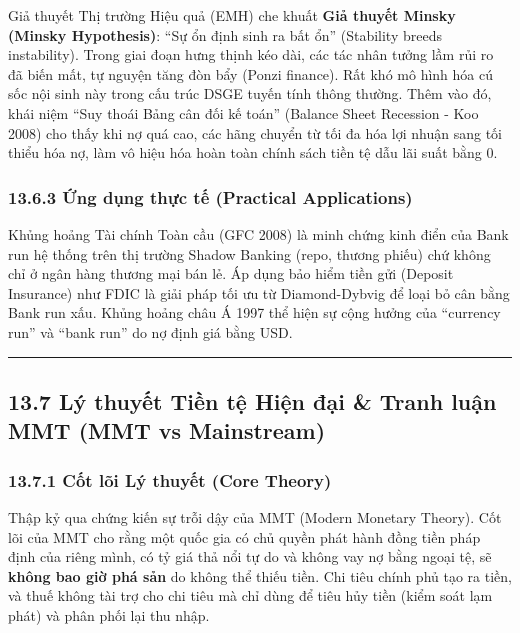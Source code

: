 \documentclass[
]{article}
\begin{document}
Giả thuyết Thị trường Hiệu quả (EMH) che khuất \textbf{Giả thuyết Minsky
(Minsky Hypothesis)}: ``Sự ổn định sinh ra bất ổn'' (Stability breeds
instability). Trong giai đoạn hưng thịnh kéo dài, các tác nhân tưởng lầm
rủi ro đã biến mất, tự nguyện tăng đòn bẩy (Ponzi finance). Rất khó mô
hình hóa cú sốc nội sinh này trong cấu trúc DSGE tuyến tính thông
thường. Thêm vào đó, khái niệm ``Suy thoái Bảng cân đối kế toán''
(Balance Sheet Recession - Koo 2008) cho thấy khi nợ quá cao, các hãng
chuyển từ tối đa hóa lợi nhuận sang tối thiểu hóa nợ, làm vô hiệu hóa
hoàn toàn chính sách tiền tệ dẫu lãi suất bằng 0.

\subsubsection{13.6.3 Ứng dụng thực tế (Practical
Applications)}\label{ux1ee9ng-dux1ee5ng-thux1ef1c-tux1ebf-practical-applications-51}

Khủng hoảng Tài chính Toàn cầu (GFC 2008) là minh chứng kinh điển của
Bank run hệ thống trên thị trường Shadow Banking (repo, thương phiếu)
chứ không chỉ ở ngân hàng thương mại bán lẻ. Áp dụng bảo hiểm tiền gửi
(Deposit Insurance) như FDIC là giải pháp tối ưu từ Diamond-Dybvig để
loại bỏ cân bằng Bank run xấu. Khủng hoảng châu Á 1997 thể hiện sự cộng
hưởng của ``currency run'' và ``bank run'' do nợ định giá bằng USD.

\begin{center}\rule{0.5\linewidth}{0.5pt}\end{center}

\subsection{13.7 Lý thuyết Tiền tệ Hiện đại \& Tranh luận MMT (MMT vs
Mainstream)}\label{luxfd-thuyux1ebft-tiux1ec1n-tux1ec7-hiux1ec7n-ux111ux1ea1i-tranh-luux1eadn-mmt-mmt-vs-mainstream}

\subsubsection{13.7.1 Cốt lõi Lý thuyết (Core
Theory)}\label{cux1ed1t-luxf5i-luxfd-thuyux1ebft-core-theory-45}

Thập kỷ qua chứng kiến sự trỗi dậy của MMT (Modern Monetary Theory). Cốt
lõi của MMT cho rằng một quốc gia có chủ quyền phát hành đồng tiền pháp
định của riêng mình, có tỷ giá thả nổi tự do và không vay nợ bằng ngoại
tệ, sẽ \textbf{không bao giờ phá sản} do không thể thiếu tiền. Chi tiêu
chính phủ tạo ra tiền, và thuế không tài trợ cho chi tiêu mà chỉ dùng để
tiêu hủy tiền (kiểm soát lạm phát) và phân phối lại thu nhập.
\end{document}
